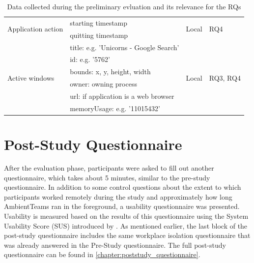 \begin{table}[h]
\begin{tabularx}{.9\textwidth}{l X l l}
        \midrule
        \multirow{2}{*}{Application action}  & starting timestamp                     & \multirow{2}{*}{Local}  & \multirow{2}{*}{RQ4    }      \\
                                             & quitting timestamp                     &                         &                               \\


        \midrule
        \multirow{6}{*}{Active windows}      & title: e.g. 'Unicorns - Google Search' & \multirow{6}{*}{Local}  & \multirow{6}{*}{RQ3, RQ4}     \\
                                             & id: e.g. '5762'                        &                         &                               \\
                                             & bounds: x, y, height, width            &                         &                               \\
                                             & owner: owning process                  &                         &                               \\
                                             & url: if application is a web browser   &                         &                               \\
                                             & memoryUsage: e.g. '11015432'           &                         &                               \\
        \bottomrule
    \end{tabularx}
    \caption{Data collected during the preliminary evluation and its relevance for the RQs}
    \label{table:data}
\end{table}

\section{Post-Study Questionnaire}
\label{section:poststudy_questionnaire}
After the evaluation phase, participants were asked to fill out another questionnaire, which takes about 5 minutes, similar to the pre-study questionnaire. In addition to some control questions about the extent to which participants worked remotely during the study and approximately how long AmbientTeams ran in the foreground, a usability questionnaire was presented. Usability is measured based on the results of this questionnaire using the System Usability Score (SUS) introduced by \textcite{brooke1996sus}. As mentioned earlier, the last block of the post-study questionnaire includes the same workplace isolation questionnaire that was already answered in the Pre-Study questionnaire. The full post-study questionnaire can be found in \autoref{chapter:poststudy_questionnaire}.


